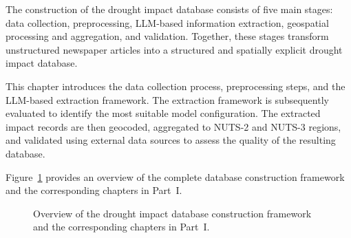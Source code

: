 The construction of the drought impact database consists of five main stages: data collection, preprocessing, LLM-based information extraction, geospatial processing and aggregation, and validation. Together, these stages transform unstructured newspaper articles into a structured and spatially explicit drought impact database.

This chapter introduces the data collection process, preprocessing steps, and the LLM-based extraction framework. The extraction framework is subsequently evaluated to identify the most suitable model configuration. The extracted impact records are then geocoded, aggregated to NUTS-2 and NUTS-3 regions, and validated using external data sources to assess the quality of the resulting database.

Figure~\ref{fig:pipeline_overview} provides an overview of the complete database construction framework and the corresponding chapters in Part~I.


\begin{figure}[h]
    \centering
    \caption{Overview of the drought impact database construction framework and the corresponding chapters in Part~I.}
    \label{fig:pipeline_overview}
\end{figure}


